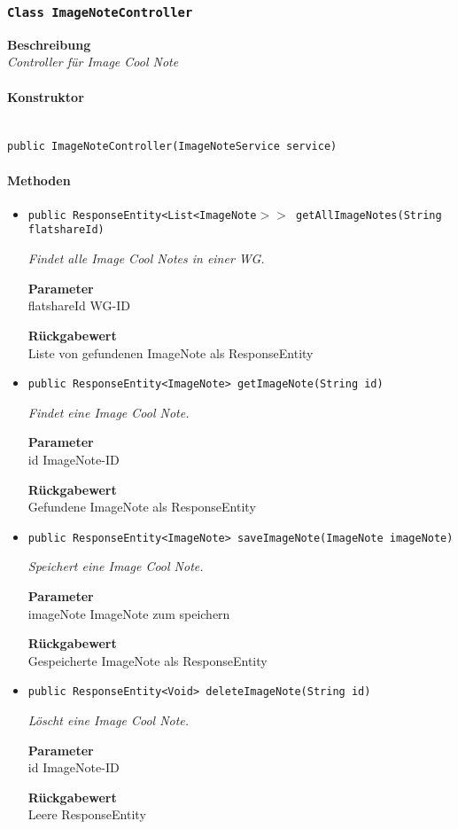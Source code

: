      \subsubsection{\texttt{Class ImageNoteController}}
     \textbf{Beschreibung} \\
     \textit{Controller für Image Cool Note}
     \paragraph*{Konstruktor}\mbox{} \\
     \texttt{public ImageNoteController(ImageNoteService service)} \\
     \paragraph*{Methoden}
     \begin{itemize}
     	\item{\texttt{public ResponseEntity<List<ImageNote$>>$ getAllImageNotes(String flatshareId)}}
     	
     	\textit{Findet alle Image Cool Notes in einer WG.}
     	
     	\textbf{Parameter} \\
     	flatshareId WG-ID
     	
     	\textbf{Rückgabewert} \\
     	Liste von gefundenen ImageNote als ResponseEntity        \item{\texttt{public ResponseEntity<ImageNote> getImageNote(String id)}}
     	
     	\textit{Findet eine Image Cool Note.}
     	
     	\textbf{Parameter} \\
     	id ImageNote-ID
     	
     	\textbf{Rückgabewert} \\
     	Gefundene ImageNote als ResponseEntity        \item{\texttt{public ResponseEntity<ImageNote> saveImageNote(ImageNote imageNote)}}
     	
     	\textit{Speichert eine Image Cool Note.}
     	
     	\textbf{Parameter} \\
     	imageNote ImageNote zum speichern
     	
     	\textbf{Rückgabewert} \\
     	Gespeicherte ImageNote als ResponseEntity        \item{\texttt{public ResponseEntity<Void> deleteImageNote(String id)}}
     	
     	\textit{Löscht eine Image Cool Note.}
     	
     	\textbf{Parameter} \\
     	id ImageNote-ID
     	
     	\textbf{Rückgabewert} \\
     	Leere ResponseEntity
     \end{itemize}
